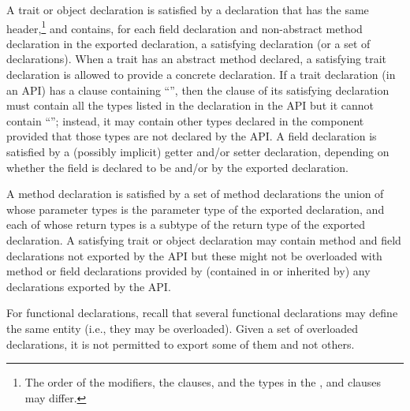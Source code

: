 A trait or object declaration is satisfied by
a declaration
that has the same header,\footnote{The order of
the modifiers,
the clauses,
and the types in the
,  and  clauses
may differ.}
and contains,
for each field declaration and non-abstract method declaration
in the exported declaration,
a satisfying declaration (or a set of declarations).
When a trait has an abstract method declared,
a satisfying trait declaration is allowed to provide a concrete declaration.
If a trait declaration (in an API)
has a  clause containing ``\EXP{\ldots}'',
then the  clause of its satisfying declaration
must contain all the types listed in the declaration in the API
but it cannot contain ``\EXP{\ldots}'';
instead, it may contain other types declared in the component
provided that those types are not declared by the API.
A field declaration is satisfied by
a (possibly implicit) getter and/or setter declaration,
depending on whether the field
is declared to be  and/or 
by the exported declaration.

A method declaration is satisfied
by a set of method declarations
the union of whose parameter types
is the parameter type of the exported declaration,
and each of whose return types
is a subtype of the return type of the exported declaration.
A satisfying trait or object declaration
may contain method and field declarations not exported by the API
but these might not be overloaded
with method or field declarations provided by
(contained in or inherited by)
any declarations exported by the API.

For functional declarations,
recall that several functional declarations
may define the same entity (i.e., they may be overloaded).
Given a set of overloaded declarations,
it is not permitted to export some of them and not others.



